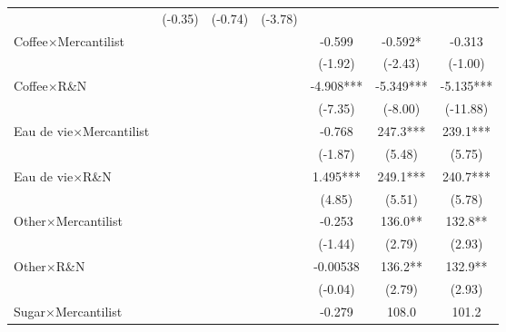 {\begin{tabular}{l*{6}{c}}
                    &     (-0.35)         &     (-0.74)         &     (-3.78)         &                     &                     &                     \\
[1em]
Coffee$\times$Mercantilist&                     &                     &                     &      -0.599         &      -0.592*  &      -0.313         \\
                    &                     &                     &                     &     (-1.92)         &     (-2.43)         &     (-1.00)         \\
[1em]
Coffee$\times$R\&N &                     &                     &                     &      -4.908***&      -5.349***&      -5.135***\\
                    &                     &                     &                     &     (-7.35)         &     (-8.00)         &    (-11.88)         \\
[1em]
Eau de vie$\times$Mercantilist&                     &                     &                     &      -0.768         &       247.3***&       239.1***\\
                    &                     &                     &                     &     (-1.87)         &      (5.48)         &      (5.75)         \\
[1em]
Eau de vie$\times$R\&N &                     &                     &                     &       1.495***&       249.1***&       240.7***\\
                    &                     &                     &                     &      (4.85)         &      (5.51)         &      (5.78)         \\
[1em]
Other$\times$Mercantilist&                     &                     &                     &      -0.253         &       136.0** &       132.8** \\
                    &                     &                     &                     &     (-1.44)         &      (2.79)         &      (2.93)         \\
[1em]
Other$\times$R\&N &                     &                     &                     &    -0.00538         &       136.2** &       132.9** \\
                    &                     &                     &                     &     (-0.04)         &      (2.79)         &      (2.93)         \\
[1em]
Sugar$\times$Mercantilist&                     &                     &                     &      -0.279         &       108.0         &       101.2         \\

\end{tabular}}
